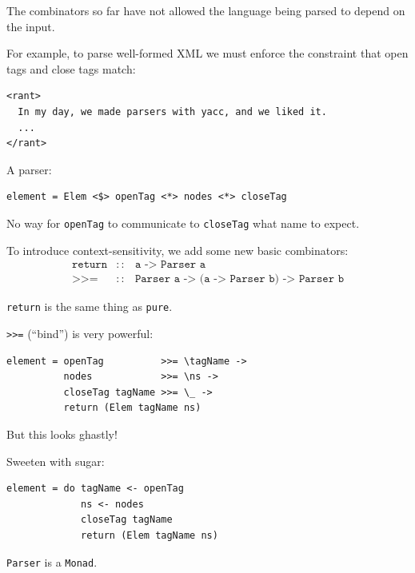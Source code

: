 \documentclass{beamer}
\begin{document}
\begin{frame}[containsverbatim]
  The combinators so far have not allowed the language being parsed to
  depend on the input.

  \bigskip

  For example, to parse well-formed XML we must enforce the constraint
  that open tags and close tags match:
\begin{verbatim}
<rant>
  In my day, we made parsers with yacc, and we liked it.
  ...
</rant>
\end{verbatim}

  \bigskip

  A parser:
\begin{verbatim}
element = Elem <$> openTag <*> nodes <*> closeTag
\end{verbatim}
  No way for \texttt{openTag} to communicate to \texttt{closeTag} what
  name to expect.
\end{frame}

\begin{frame}[containsverbatim]
  To introduce context-sensitivity, we add some new basic combinators:
  \begin{eqnarray*}
    \texttt{return} & :: & \texttt{a -> Parser a} \\
    \texttt{>>=}    & :: & \texttt{Parser a -> (a -> Parser b) -> Parser b}
  \end{eqnarray*}

  \bigskip

  \texttt{return} is the same thing as \texttt{pure}.

  \bigskip

  \texttt{>>=} (``bind'') is very powerful:
\begin{verbatim}
element = openTag          >>= \tagName ->
          nodes            >>= \ns ->
          closeTag tagName >>= \_ ->
          return (Elem tagName ns)
\end{verbatim}
\end{frame}

\begin{frame}[containsverbatim]
  But this looks ghastly!

  \bigskip

  Sweeten with sugar:
\begin{verbatim}
element = do tagName <- openTag
             ns <- nodes
             closeTag tagName
             return (Elem tagName ns)
\end{verbatim}

  \bigskip

  \texttt{Parser} is a \texttt{Monad}.
\end{frame}
\end{document}
